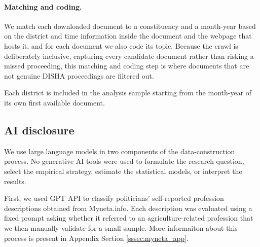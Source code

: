 \documentclass[12pt]{article}
\begin{document}
\paragraph{Matching and coding.} We match each downloaded document to a constituency and a
month-year based on the district and time information inside the document and
the webpage that hosts it, and for each document we also code its topic. Because
the crawl is deliberately inclusive, capturing every candidate document rather
than risking a missed proceeding, this matching and coding step is where
documents that are not genuine DISHA proceedings are filtered out.

Each district is included in the analysis sample starting from the month-year of its own first available document.

 \subsection{AI disclosure}\label{ssec:ai}



We use large language models in two components of the data-construction process. No generative AI tools were used to formulate the research question, select the empirical strategy, estimate the statistical models, or interpret the results.

First, we used GPT API to classify politicians’ self-reported profession descriptions obtained from Myneta.info. Each description was evaluated using a fixed prompt asking whether it referred to an agriculture-related profession that we then manually validate for a small sample. More informaiton about this process is present in Appendix Section \ref{sssec:myneta_app}.
\end{document}
